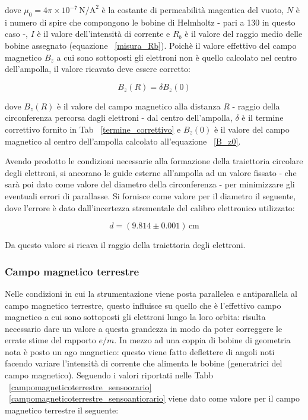 \documentclass[]{article}
\begin{document}
    dove $\mu _0 = 4\pi \times 10^{-7} \, \text{N/A}^2 $ è la costante di permeabilità magentica del vuoto, $N$ è i numero di spire che compongono le bobine di Helmholtz - pari a 130 in questo caso -, $I$ è il valore dell'intensità di corrente e $R_b$ è il valore del raggio medio delle bobine assegnato (equazione ~\ref{misura_Rb}).
    Poichè il valore effettivo del campo magnetico $B_z$ a cui sono sottoposti gli elettroni non è quello calcolato nel centro dell'ampolla, il valore ricavato deve essere corretto:

    \begin{equation}
        \label{B_zR}
        B_z(R) = \delta B_z(0)
    \end{equation}

    dove $B_z(R) $ è il valore del campo magnetico alla distanza $ R $ - raggio della circonferenza percorsa dagli elettroni - dal centro dell'ampolla, $\delta$ è il termine correttivo fornito in Tab ~\ref{termine_correttivo} e $B_z(0)$ è il valore del campo magnetico al centro dell'ampolla calcolato all'equazione ~\ref{B_z0}.



    Avendo prodotto le condizioni necessarie alla formazione della traiettoria circolare degli elettroni, si ancorano le guide esterne all'ampolla ad un valore fissato - che sarà poi dato come valore del diametro della circonferenza - per minimizzare gli eventuali errori di parallasse. Si fornisce come valore per il diametro il seguente, dove l'errore è dato dall'incertezza strementale del calibro elettronico utilizzato: 

    \begin{equation}
        \label{misura_d}
        d = ( 9.814\pm 0.001) \, \text{cm}
    \end{equation} 

    Da questo valore si ricava il raggio della traiettoria degli elettroni. \\

    \subsubsection{Campo magnetico terrestre}

    Nelle condizioni in cui la strumentazione viene posta parallelea e antiparallela al campo magnetico terrestre, questo influisce su quello che è l'effettivo campo magnetico a cui sono sottoposti gli elettroni lungo la loro orbita: risulta necessario dare un valore a questa grandezza in modo da poter correggere le errate stime del rapporto $e/m$.
    In mezzo ad una coppia di bobine di geometria nota è posto un ago magnetico: questo viene fatto deflettere di angoli noti facendo variare l'intensità di corrente che alimenta le bobine (generatrici del campo magnetico). Seguendo i valori riportati nelle Tabb ~\ref{campomagneticoterrestre_sensoorario} ~\ref{campomagneticoterrestre_sensoantiorario} viene dato come valore per il campo magnetico terrestre il seguente:
\end{document}
